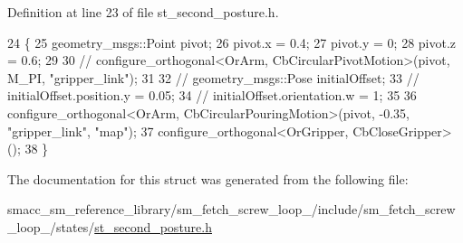 Definition at line 23 of file st\+\_\+second\+\_\+posture.\+h.


\begin{DoxyCode}
24         \{
25             geometry\_msgs::Point pivot;
26             pivot.x = 0.4;
27             pivot.y = 0;
28             pivot.z = 0.6;
29 
30             \textcolor{comment}{// configure\_orthogonal<OrArm, CbCircularPivotMotion>(pivot, M\_PI, "gripper\_link");}
31 
32             \textcolor{comment}{// geometry\_msgs::Pose initialOffset;}
33             \textcolor{comment}{// initialOffset.position.y = 0.05;}
34             \textcolor{comment}{// initialOffset.orientation.w = 1;}
35 
36             configure\_orthogonal<OrArm, CbCircularPouringMotion>(pivot, -0.35, \textcolor{stringliteral}{"gripper\_link"}, \textcolor{stringliteral}{"map"});
37             configure\_orthogonal<OrGripper, CbCloseGripper>();
38         \}
\end{DoxyCode}


The documentation for this struct was generated from the following file\+:\begin{DoxyCompactItemize}
\item 
smacc\+\_\+sm\+\_\+reference\+\_\+library/sm\+\_\+fetch\+\_\+screw\+\_\+loop\+\_/include/sm\+\_\+fetch\+\_\+screw\+\_\+loop\+\_/states/\hyperlink{st__second__posture_8h}{st\+\_\+second\+\_\+posture.\+h}\end{DoxyCompactItemize}
